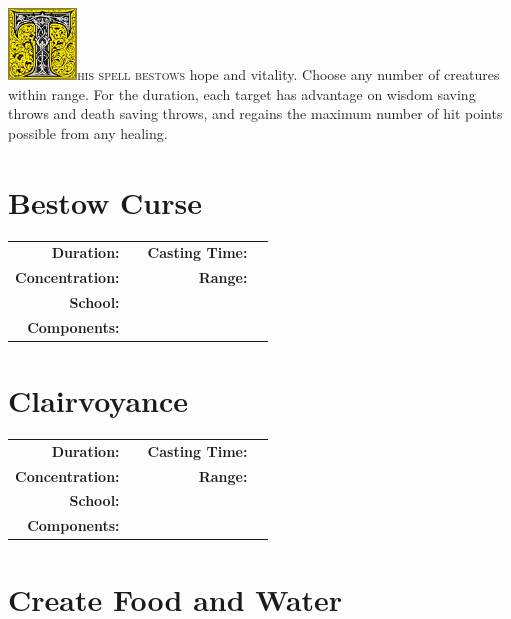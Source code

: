 \documentclass[12pt,showtrims]{memoir}
\begin{document}
\vspace{1\baselineskip}\noindent 
\lettrine[lines=4]{\includegraphics[height=54pt]{initials/T.png}}{his spell bestows} hope and vitality. Choose any number of creatures within range. For the duration, each target has advantage on wisdom saving throws and death saving throws, and regains the maximum number of hit points possible from any healing.
\newpage
{}
\newpage
\section*{Bestow Curse}
{
\small\centering\vspace{-6pt}
\begin{tabular}{rlrl}
\toprule

\textbf{Duration:} &  &
\textbf{Casting Time:} &  \\
\textbf{Concentration:} & &
\textbf{Range:} &  \\
\textbf{School:} &  \\
\textbf{Components:} & \multicolumn{3}{p{0.7\textwidth}}{}\\

\bottomrule
\end{tabular}
}
\newpage
\section*{Clairvoyance}
{
\small\centering\vspace{-6pt}
\begin{tabular}{rlrl}
\toprule

\textbf{Duration:} &  &
\textbf{Casting Time:} &  \\
\textbf{Concentration:} & &
\textbf{Range:} &  \\
\textbf{School:} &  \\
\textbf{Components:} & \multicolumn{3}{p{0.7\textwidth}}{}\\

\bottomrule
\end{tabular}
}
\newpage
\section*{Create Food and Water}
\end{document}

